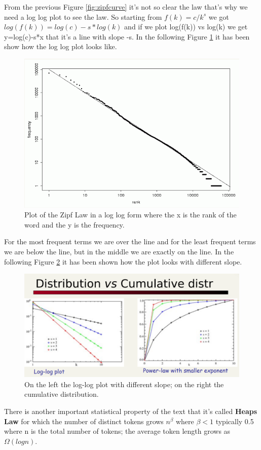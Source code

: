 From the previous Figure \ref{fig:zipfcurve} it's not so clear the law that's why we need a log log plot to see the law. So starting from $f(k)=c/k^s$ we got $log(f(k))=log(c)-s*log(k)$ and if we plot log(f(k)) vs log(k) we get y=log(c)-s*x that it's a line with slope -s.
In the following Figure \ref{fig:loglogzipflaw} it has been show how the log log plot looks like.
\begin{figure}
    \centering
    \includegraphics[width=0.75\linewidth]{images/loglogzipflaw.png}
    \caption{Plot of the Zipf Law in a log log form where the x is the rank of the word and the y is the frequency.}
    \label{fig:loglogzipflaw}
\end{figure}
For the most frequent terms we are over the line and for the least frequent terms we are below the line, but in the middle we are exactly on the line.\newline
In the following Figure \ref{fig:loglogzipfs} it has been shown how the plot looks with different slope.
\begin{figure}
    \centering
    \includegraphics[width=0.75\linewidth]{images/loglogzipfs.png}
    \caption{On the left the log-log plot with different slope; on the right the cumulative distribution.}
    \label{fig:loglogzipfs}
\end{figure}
There is another important statistical property of the text that it's called \textbf{Heaps Law} for which the number of distinct tokens grows $n^\beta$ where $\beta<1$ typically 0.5 where n is the total number of tokens; the average token length grows as $\Omega(log n)$.\newline
